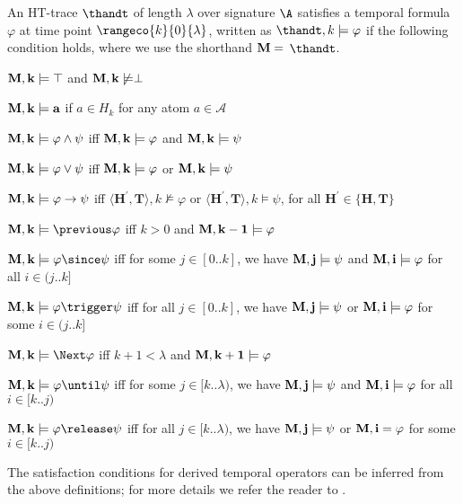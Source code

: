 \begin{definition}
  An HT-trace $\thandt$ of length $\lambda$ over signature $\A$
  satisfies a temporal formula $\varphi$ at time point
  $\rangeco{k}{0}{\lambda}$, written as $\thandt,k \models \varphi$ if
  the following condition holds, where we use the shorthand
  $\bf{M} =$ $\thandt$.
\begin{description}
  \item $\bf{M},k \models \top$ and $\bf{M}, k \not \models \perp$
  \item $\bf{M},k \models a$ if $a \in H_{k}$ for any atom $a \in \mathcal{A}$
  \item $\bf{M},k \models \varphi \wedge \psi$ iff $\bf{M}, k \models \varphi$ and $\bf{M}, k \models \psi$
  \item $\bf{M},k \models \varphi \vee \psi$ iff $\bf{M}, k \models \varphi$ or $\bf{M}, k \models \psi$
  \item $\bf{M},k \models \varphi \rightarrow \psi$ iff 
    $\langle \bm{H}^{\prime},\bm{T} \rangle, k \not \models \varphi$ 
    or $\langle \bm{H}^{\prime},\bm{T} \rangle, k \models \psi$, 
    for all $\bm{H}^{\prime} \in\{\bm{H}, \bm{T}\}$
  \item $\bf{M},k \models \previous \varphi$ iff $k>0$ and $\bf{M},k-1 \models \varphi$
  \item $\bf{M},k \models \varphi \since \psi$ iff for some $j \in[0 . . k]$, we have $\bf{M}, j \models \psi$ and $\bf{M},i \models \varphi$ for all $i \in(j . . k]$
  \item $\bf{M},k \models \varphi \trigger \psi$ iff for all $j \in[0 . . k]$, we have $\bf{M}, j \models \psi$ or $\bf{M}, i \models \varphi$ for some $i \in(j . . k]$
  \item $\bf{M},k \models \Next \varphi$ iff $k+1<\lambda$ and $\bf{M}, k+1 \models \varphi$
  \item $\bf{M}, k \models \varphi \until \psi$ iff for some $j \in[k . . \lambda)$, we have $\bf{M}, j \models \psi$ and $\bf{M}, i \models \varphi$ for all $i \in[k . . j)$
  \item $\bf{M}, k \models \varphi \release \psi$ iff for all $j \in[k
    . . \lambda)$, we have $\bf{M}, j \models \psi$ or $\bf{M},
    i=\varphi$ for some $i \in[k . . j)$
\end{description}
\end{definition}

The satisfaction conditions for derived temporal operators can be
inferred from the above definitions; for more details we refer the
reader to \cite{agcadipescscvi20a}.


